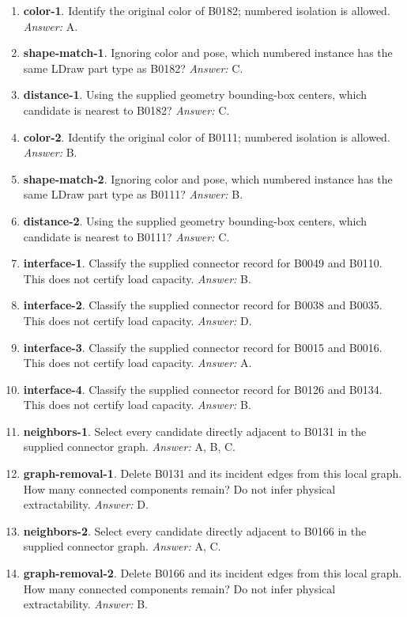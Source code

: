 \begin{enumerate}
\item \textbf{color-1}. Identify the original color of B0182; numbered isolation is allowed. \textit{Answer:} A.
\item \textbf{shape-match-1}. Ignoring color and pose, which numbered instance has the same LDraw part type as B0182? \textit{Answer:} C.
\item \textbf{distance-1}. Using the supplied geometry bounding-box centers, which candidate is nearest to B0182? \textit{Answer:} C.
\item \textbf{color-2}. Identify the original color of B0111; numbered isolation is allowed. \textit{Answer:} B.
\item \textbf{shape-match-2}. Ignoring color and pose, which numbered instance has the same LDraw part type as B0111? \textit{Answer:} B.
\item \textbf{distance-2}. Using the supplied geometry bounding-box centers, which candidate is nearest to B0111? \textit{Answer:} C.
\item \textbf{interface-1}. Classify the supplied connector record for B0049 and B0110. This does not certify load capacity. \textit{Answer:} B.
\item \textbf{interface-2}. Classify the supplied connector record for B0038 and B0035. This does not certify load capacity. \textit{Answer:} D.
\item \textbf{interface-3}. Classify the supplied connector record for B0015 and B0016. This does not certify load capacity. \textit{Answer:} A.
\item \textbf{interface-4}. Classify the supplied connector record for B0126 and B0134. This does not certify load capacity. \textit{Answer:} B.
\item \textbf{neighbors-1}. Select every candidate directly adjacent to B0131 in the supplied connector graph. \textit{Answer:} A, B, C.
\item \textbf{graph-removal-1}. Delete B0131 and its incident edges from this local graph. How many connected components remain? Do not infer physical extractability. \textit{Answer:} D.
\item \textbf{neighbors-2}. Select every candidate directly adjacent to B0166 in the supplied connector graph. \textit{Answer:} A, C.
\item \textbf{graph-removal-2}. Delete B0166 and its incident edges from this local graph. How many connected components remain? Do not infer physical extractability. \textit{Answer:} B.

\end{enumerate}
